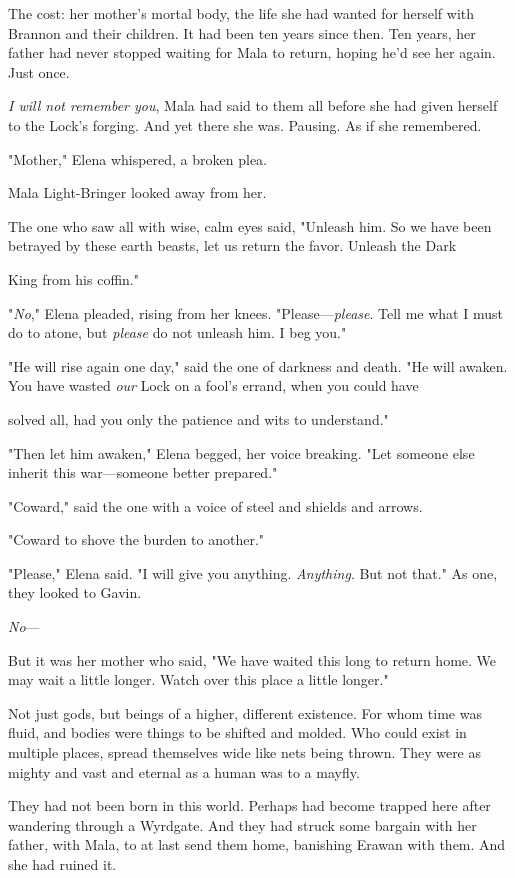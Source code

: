 The cost: her mother's mortal body, the life she had wanted for herself with Brannon and their children. It had been ten years since then. Ten years, her father had never stopped waiting for Mala to return, hoping he'd see her again. Just once.

\emph{I will not remember you}, Mala had said to them all before she had given herself to the Lock's forging. And yet there she was. Pausing. As if she remembered.

"Mother," Elena whispered, a broken plea.

Mala Light-Bringer looked away from her.

The one who saw all with wise, calm eyes said, "Unleash him. So we have been betrayed by these earth beasts, let us return the favor. Unleash the Dark

King from his coffin."

"\emph{No}," Elena pleaded, rising from her knees. "Please---\emph{please}. Tell me what I must do to atone, but
\emph{please} do not unleash him. I beg you."

"He will rise again one day," said the one of darkness and death. "He will awaken. You have wasted \emph{our} Lock on a fool's errand, when you could have

solved all, had you only the patience and wits to understand."

"Then let him awaken," Elena begged, her voice breaking. "Let someone else inherit this war---someone better prepared."

"Coward," said the one with a voice of steel and shields and arrows.

"Coward to shove the burden to another."

"Please," Elena said. "I will give you anything. \emph{Anything}. But not that." As one, they looked to Gavin.

\emph{No}---

But it was her mother who said, "We have waited this long to return home. We may wait a little longer. Watch over this  place a little longer."

Not just gods, but beings of a higher, different existence. For whom time was fluid, and bodies were things to be shifted and molded. Who could exist in multiple places, spread themselves wide like nets being thrown. They were as mighty and vast and eternal as a human was to a mayfly.

They had not been born in this world. Perhaps had become trapped here after wandering through a Wyrdgate. And they had struck some bargain with her father, with Mala, to at last send them home, banishing Erawan with them. And she had ruined it.

